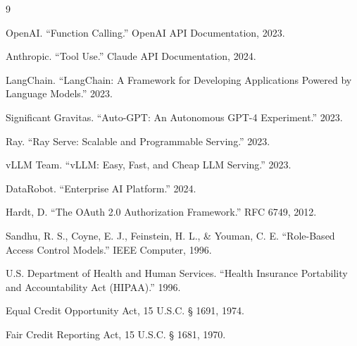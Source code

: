 \documentclass[11pt,a4paper]{article}
\begin{document}
\begin{thebibliography}{9}

OpenAI. ``Function Calling.'' OpenAI API Documentation, 2023.

Anthropic. ``Tool Use.'' Claude API Documentation, 2024.

LangChain. ``LangChain: A Framework for Developing Applications Powered by Language Models.'' 2023.

Significant Gravitas. ``Auto-GPT: An Autonomous GPT-4 Experiment.'' 2023.

Ray. ``Ray Serve: Scalable and Programmable Serving.'' 2023.

vLLM Team. ``vLLM: Easy, Fast, and Cheap LLM Serving.'' 2023.

DataRobot. ``Enterprise AI Platform.'' 2024.

Hardt, D. ``The OAuth 2.0 Authorization Framework.'' RFC 6749, 2012.

Sandhu, R. S., Coyne, E. J., Feinstein, H. L., \& Youman, C. E. ``Role-Based Access Control Models.'' IEEE Computer, 1996.

U.S. Department of Health and Human Services. ``Health Insurance Portability and Accountability Act (HIPAA).'' 1996.

Equal Credit Opportunity Act, 15 U.S.C. § 1691, 1974.

Fair Credit Reporting Act, 15 U.S.C. § 1681, 1970.

\end{thebibliography}
\end{document}
